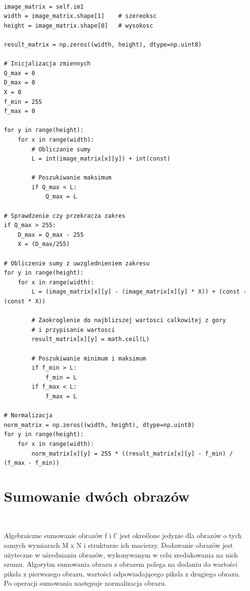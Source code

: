 \documentclass[final,a4paper,openany,12pt]{mwbk}
\begin{document}
\begin{lstlisting}[caption=Sumowanie obrazu szarego ze stałą]

image_matrix = self.im1
width = image_matrix.shape[1]    # szereoksc
height = image_matrix.shape[0]   # wysokosc

result_matrix = np.zeros((width, height), dtype=np.uint8)

# Inicjalizacja zmiennych
Q_max = 0
D_max = 0
X = 0
f_min = 255
f_max = 0

for y in range(height):
    for x in range(width):  
        # Obliczanie sumy
        L = int(image_matrix[x][y]) + int(const)

        # Poszukiwanie maksimum
        if Q_max < L:
            Q_max = L

# Sprawdzenie czy przekracza zakres
if Q_max > 255:
    D_max = Q_max - 255
    X = (D_max/255)

# Obliczenie sumy z uwzglednieniem zakresu
for y in range(height):
    for x in range(width): 
        L = (image_matrix[x][y] - (image_matrix[x][y] * X)) + (const - (const * X))

        # Zaokroglenie do najblizszej wartosci calkowitej z gory
        # i przypisanie wartosci
        result_matrix[x][y] = math.ceil(L)

        # Poszukiwanie minimum i maksimum
        if f_min > L:
            f_min = L
        if f_max < L:
            f_max = L

# Normalizacja
norm_matrix = np.zeros((width, height), dtype=np.uint8)
for y in range(height):
    for x in range(width):
        norm_matrix[x][y] = 255 * ((result_matrix[x][y] - f_min) / (f_max - f_min))

\end{lstlisting}

\newpage

\section {Sumowanie dwóch obrazów}
\hfill\\
\indent

Algebraiczne sumowanie obrazów f i f' jest określone jedynie dla obrazów o tych samych wymiarach M x N i strukturze ich macierzy.
Dodawanie obrazów jest użyteczne w uśrednianiu obrazów, wykonywanym w celu zredukowania na nich szumu.
Algorytm sumowania obrazu z obrazem polega na dodaniu do wartości piksla z pierwszego obrazu, wartości odpowiadającego piksla z drugiego obrazu.
Po operacji sumowania następuje normalizacja obrazu.
\end{document}
